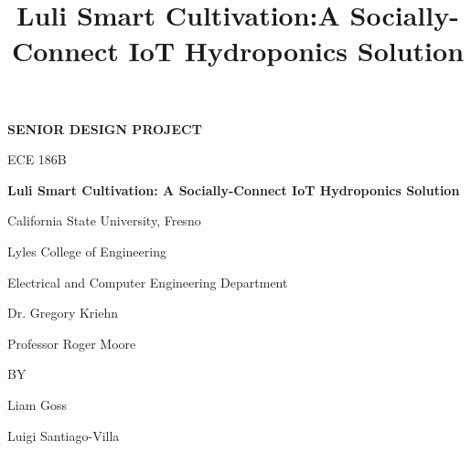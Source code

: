 \documentclass[12pt]{article} %
\begin{document}

\title{Luli Smart Cultivation:A Socially-Connect IoT Hydroponics Solution}

\begin{titlepage}
    \centering
    {\Large\bfseries SENIOR DESIGN PROJECT\par}
    \vspace{1.5cm}
    {\Large ECE 186B\par}
    \vspace{1.5cm}
    {\Large\bfseries Luli Smart Cultivation: A Socially-Connect IoT Hydroponics Solution\par}
    \vspace{3cm}
    {\large California State University, Fresno\par}
    {\large Lyles College of Engineering\par}
    {\large Electrical and Computer Engineering Department\par}
    \vspace{2cm}
    {\large Dr. Gregory Kriehn\par}
    {\large Professor Roger Moore\par}
    \vspace{2cm}
    {\large BY\par}
    \vspace{1cm}
    {\large Liam Goss\par}
    {\large Luigi Santiago-Villa\par}
\end{titlepage}

\tableofcontents
\newpage

\listoffigures
\newpage
\end{document}
